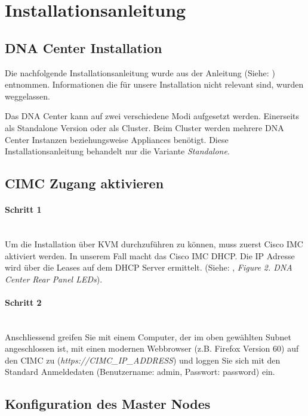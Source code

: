 \section{Installationsanleitung}

\subsection{DNA Center Installation}
Die nachfolgende Installationsanleitung wurde aus der Anleitung (Siehe: \cite{cisco-dna-installation-guide-1-2-chapter-configure}) entnommen. Informationen die für unsere Installation nicht relevant sind, wurden weggelassen. 

Das DNA Center kann auf zwei verschiedene Modi aufgesetzt werden. Einerseits als Standalone Version oder als Cluster. Beim Cluster werden mehrere DNA Center Instanzen beziehungsweise Appliances benötigt. Diese Installationsanleitung behandelt nur die Variante \textit{Standalone}.

\subsection{CIMC Zugang aktivieren}
\paragraph{Schritt 1}
\label{installguide-cimc-step1}
~\\
Um die Installation über KVM durchzuführen zu können, muss zuerst Cisco IMC aktiviert werden. In unserem Fall macht das Cisco IMC DHCP. Die IP Adresse wird über die Leases auf dem DHCP Server ermittelt. (Siehe: \cite{cisco-dna-installation-guide-1-2-chapter-install}, \textit{Figure 2. DNA Center Rear Panel LEDs}). 

\paragraph{Schritt 2}
~\\
Anschliessend greifen Sie mit einem Computer, der im oben gewählten Subnet angeschlossen ist, mit einen modernen Webbrowser (z.B. Firefox Version 60) auf den CIMC zu (\textit{https://CIMC\_IP\_ADDRESS}) und loggen Sie sich mit den Standard Anmeldedaten (Benutzername: admin, Passwort: password) ein. 

\subsection{Konfiguration des Master Nodes}
